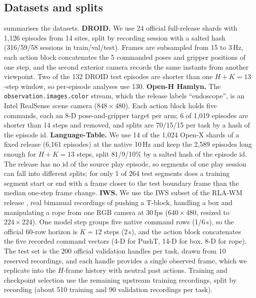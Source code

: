 \subsection{Datasets and splits}\label{app:data}

 summarises the datasets.
%
\textbf{DROID.} We use 24 official full-release shards with 1{,}126 episodes from 14 sites, split by recording session
with a salted hash (316/59/58 sessions in train/val/test).
%
Frames are subsampled from 15 to 3\,Hz, each action block concatenates the 5 commanded poses and gripper positions of
one step, and the second exterior camera records the same instants from another viewpoint.
%
Two of the 132 DROID test episodes are shorter than one $H{+}K{=}13$-step window, so per-episode analyses use 130.
%
\textbf{Open-H Hamlyn.} The \texttt{observation.images.color} stream, which the release labels ``endoscope'', is an Intel
RealSense scene camera ($848{\times}480$).
%
Each action block holds five commands, each an 8-D pose-and-gripper target per arm; 6 of 1{,}019 episodes are shorter
than 14 steps and removed, and splits are 70/15/15 per task by a hash of the episode id.
%
\textbf{Language-Table.} We use 14 of the 1{,}024 Open-X shards of a fixed release (6{,}161 episodes) at the native
10\,Hz and keep the 2{,}589 episodes long enough for $H{+}K{=}13$ steps, split 81/9/10\% by a salted hash of the episode id.
%
The release has no id of the source play episode, so segments of one play session can fall into different splits; for
only 1 of 264 test segments does a training segment start or end with a frame closer to the test boundary frame than
the median one-step frame change.
%
\textbf{IWS.} We use the IWS subset of the RLA-WM release
\citep{wang2026iws,zhang2026rlawm}, real bimanual recordings of pushing a T-block, handling a box and manipulating a rope
from one RGB camera at 30\,fps ($640{\times}480$, resized to $224{\times}224$).
%
One model step groups five native command rows (1/6\,s), so the official 60-row horizon is $K{=}12$ steps (2\,s), and
the action block concatenates the five recorded command vectors (4-D for PushT, 14-D for box, 8-D for rope).
%
The test set is the 200 official validation handles per task, drawn from 10 reserved recordings, and each handle
provides a single observed frame, which we replicate into the $H$-frame history with neutral past actions.
%
Training and checkpoint selection use the remaining upstream training recordings, split by recording (about 510
training and 90 validation recordings per task).

